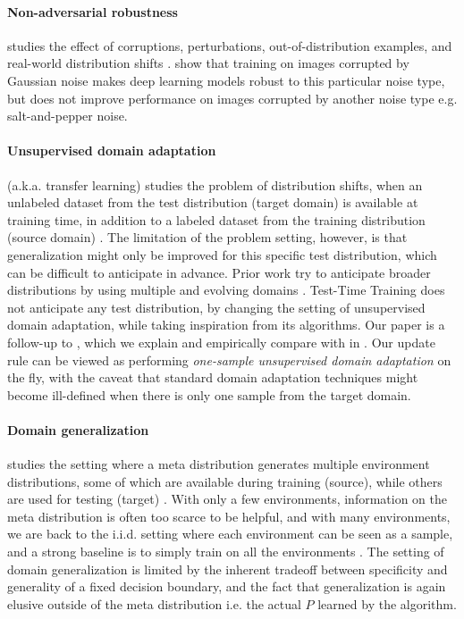 \documentclass{article}
\theoremstyle{plain}
\theoremstyle{remark}
\theoremstyle{definition}
\begin{document}
\paragraph{Non-adversarial robustness} studies the effect of corruptions, perturbations, out-of-distribution examples, and real-world distribution shifts
\citep{hendrycks2019improving, hendrycks2019using, hendrycks2018using, hendrycks2016baseline}.
\citet{geirhos2018generalisation} show that training on images corrupted by Gaussian noise makes deep learning models robust to this particular noise type, but does not improve performance on images corrupted by another noise type e.g. salt-and-pepper noise.

\paragraph{Unsupervised domain adaptation}
(a.k.a. transfer learning) studies the problem of distribution shifts, when an unlabeled dataset from the test distribution (target domain) is available at training time, 
in addition to a labeled dataset from the training distribution (source domain)
\citep{chen2011co, gong2012geodesic, long2015learning, ganin2016domain, long2016unsupervised, tzeng2017adversarial,hoffman2017cycada,csurka2017domain, chen2018adversarial}.
The limitation of the problem setting, however, is that generalization might only be improved for this specific test distribution, which can be difficult to anticipate in advance.
Prior work try to anticipate broader distributions by using multiple and evolving domains \citep{hoffman2018algorithms, hoffman2012discovering, hoffman2014continuous}.
Test-Time Training does not anticipate any test distribution, by changing the setting of unsupervised domain adaptation, while taking inspiration from its algorithms.
Our paper is a follow-up to \citet{sun2019uda}, which we explain and empirically compare with in .
Our update rule can be viewed as performing \emph{one-sample unsupervised domain adaptation} on the fly, with the caveat that standard domain adaptation techniques might become ill-defined when there is only one sample from the target domain.

\paragraph{Domain generalization} studies the setting where a meta distribution generates multiple environment distributions, some of which are available during training (source), while others are used for testing (target)
\citep{li2018deep, shankar2018generalizing, muandet2013domain, balaji2018metareg, ghifary2015domain, motiian2017unified, li2017deeper, gan2016learning}. 
With only a few environments, information on the meta distribution is often too scarce to be helpful,
and with many environments, we are back to the i.i.d. setting where each environment can be seen as a sample, and a strong baseline is to simply train on all the environments \citep{li2019episodic}.
The setting of domain generalization is limited by the inherent tradeoff between specificity and generality of a fixed decision boundary, and the fact that generalization is again elusive outside of the meta distribution i.e. the actual $P$ learned by the algorithm.
\end{document}
